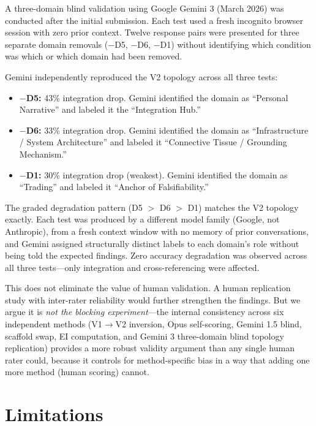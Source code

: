 \documentclass[12pt,letterpaper]{article}
\begin{document}
A three-domain blind validation using Google Gemini 3 (March 2026) was conducted after the initial submission. Each test used a fresh incognito browser session with zero prior context. Twelve response pairs were presented for three separate domain removals ($-$D5, $-$D6, $-$D1) without identifying which condition was which or which domain had been removed.

Gemini independently reproduced the V2 topology across all three tests:

\begin{itemize}[nosep]
  \item \textbf{$-$D5:} 43\% integration drop. Gemini identified the domain as ``Personal Narrative'' and labeled it the ``Integration Hub.''
  \item \textbf{$-$D6:} 33\% integration drop. Gemini identified the domain as ``Infrastructure / System Architecture'' and labeled it ``Connective Tissue / Grounding Mechanism.''
  \item \textbf{$-$D1:} 30\% integration drop (weakest). Gemini identified the domain as ``Trading'' and labeled it ``Anchor of Falsifiability.''
\end{itemize}

The graded degradation pattern (D5 $>$ D6 $>$ D1) matches the V2 topology exactly. Each test was produced by a different model family (Google, not Anthropic), from a fresh context window with no memory of prior conversations, and Gemini assigned structurally distinct labels to each domain's role without being told the expected findings. Zero accuracy degradation was observed across all three tests---only integration and cross-referencing were affected.

This does not eliminate the value of human validation. A human replication study with inter-rater reliability would further strengthen the findings. But we argue it is \emph{not the blocking experiment}---the internal consistency across six independent methods (V1$\to$V2 inversion, Opus self-scoring, Gemini 1.5 blind, scaffold swap, EI computation, and Gemini 3 three-domain blind topology replication) provides a more robust validity argument than any single human rater could, because it controls for method-specific bias in a way that adding one more method (human scoring) cannot.

\section{Limitations}
\label{sec:limitations}
\end{document}
